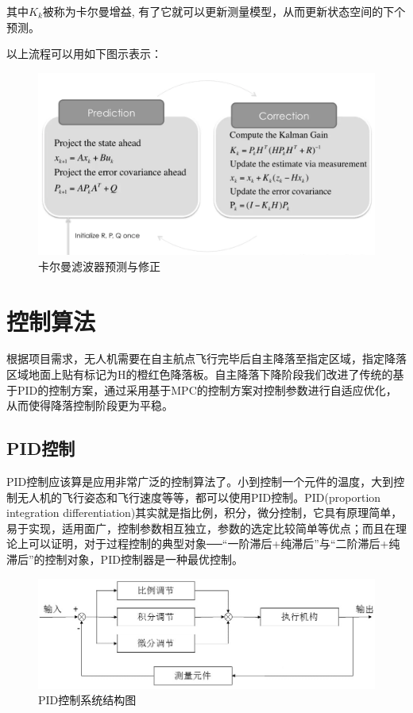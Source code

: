 其中$K_{k}$被称为卡尔曼增益, 有了它就可以更新测量模型，从而更新状态空间的下个预测。

以上流程可以用如下图示表示：

\begin{figure}[ht]
  \centering
  \includegraphics[width=0.8\linewidth]{./Figure/Kalman_Prediction_and_Correction.png}
  \caption{卡尔曼滤波器预测与修正}\label{Fig:xd1}
\end{figure}

\section{控制算法}

根据项目需求，无人机需要在自主航点飞行完毕后自主降落至指定区域，指定降落区域地面上贴有标记为H的橙红色降落板。自主降落下降阶段我们改进了传统的基于PID的控制方案，通过采用基于MPC的控制方案对控制参数进行自适应优化，从而使得降落控制阶段更为平稳。

\subsection{PID控制}

PID控制应该算是应用非常广泛的控制算法了。小到控制一个元件的温度，大到控制无人机的飞行姿态和飞行速度等等，都可以使用PID控制。PID(proportion integration differentiation)其实就是指比例，积分，微分控制，它具有原理简单，易于实现，适用面广，控制参数相互独立，参数的选定比较简单等优点；而且在理论上可以证明，对于过程控制的典型对象──“一阶滞后+纯滞后”与“二阶滞后+纯滞后”的控制对象，PID控制器是一种最优控制。

\begin{figure}[ht]
  \centering
  \includegraphics[width=0.8\linewidth]{./Figure/PID_Graph.png}
  \caption{PID控制系统结构图}\label{Fig:xd1}
\end{figure}

